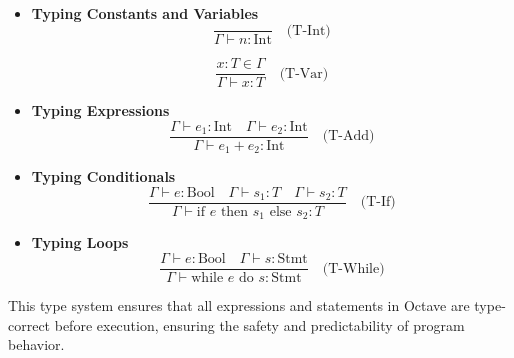 \documentclass[letterpaper,12pt]{article}
\begin{document}
\begin{itemize}
    \item \textbf{Typing Constants and Variables}
    \[
    \frac{}{\Gamma \vdash n : \text{Int}} \quad \text{(T-Int)}
    \]
    
    \[
    \frac{x : T \in \Gamma}{\Gamma \vdash x : T} \quad \text{(T-Var)}
    \]

    \item \textbf{Typing Expressions}
    \[
    \frac{\Gamma \vdash e_1 : \text{Int} \quad \Gamma \vdash e_2 : \text{Int}}{\Gamma \vdash e_1 + e_2 : \text{Int}} \quad \text{(T-Add)}
    \]

    \item \textbf{Typing Conditionals}
    \[
    \frac{\Gamma \vdash e : \text{Bool} \quad \Gamma \vdash s_1 : T \quad \Gamma \vdash s_2 : T}{\Gamma \vdash \text{if } e \text{ then } s_1 \text{ else } s_2 : T} \quad \text{(T-If)}
    \]

    \item \textbf{Typing Loops}
    \[
    \frac{\Gamma \vdash e : \text{Bool} \quad \Gamma \vdash s : \text{Stmt}}{\Gamma \vdash \text{while } e \text{ do } s : \text{Stmt}} \quad \text{(T-While)}
    \]
\end{itemize}

This type system ensures that all expressions and statements in Octave are type-correct before execution, ensuring the safety and predictability of program behavior.















  
\end{document}
